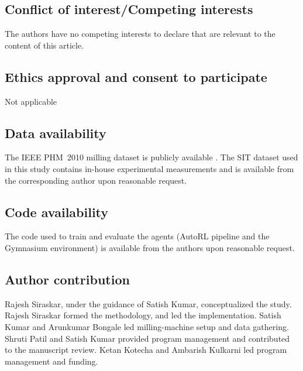 \documentclass[sn-vancouver-num]{sn-jnl}%
\begin{document}
\subsection*{Conflict of interest/Competing interests}
The authors have no competing interests to declare that are relevant to the content of this article.

\subsection*{Ethics approval and consent to participate}
Not applicable

\subsection*{Data availability}
The IEEE PHM~2010 milling dataset is publicly available \cite{PHMdata2010}. The SIT dataset used in this study contains in-house experimental measurements and is available from the corresponding author upon reasonable request.

\subsection*{Code availability}
The code used to train and evaluate the agents (AutoRL pipeline and the Gymnasium environment) is available from the authors upon reasonable request.

\subsection*{Author contribution}
Rajesh Siraskar, under the guidance of Satish Kumar, conceptualized the study. Rajesh Siraskar formed the methodology, and led the implementation. Satish Kumar and Arunkumar Bongale led milling-machine setup and data gathering. Shruti Patil and Satish Kumar provided program management and contributed to the manuscript review. Ketan Kotecha and Ambarish Kulkarni led program management and funding.
\end{document}

